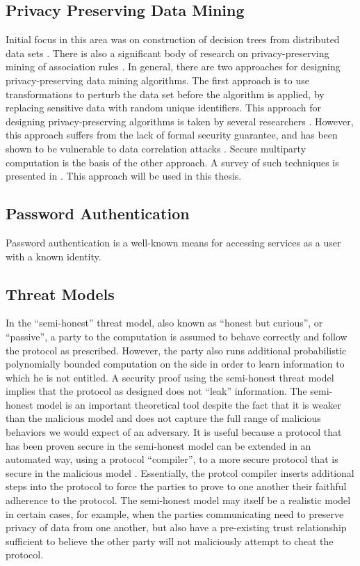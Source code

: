 \subsection{Privacy Preserving Data Mining }

Initial focus in this area was on construction of decision trees from
distributed data sets \cite{Agrawal-Srikant,Lindell-Pinkas}. There
is also a significant body of research on privacy-preserving mining
of association rules \cite{Gehrke:2002,RizviHarista,VaidyaClifton:2002}.
In general, there are two approaches for designing privacy-preserving
data mining algorithms. The first approach is to use transformations
to perturb the data set before the algorithm is applied, by replacing
sensitive data with random unique identifiers. This approach for designing
privacy-preserving algorithms is taken by several researchers \cite{Klusch,MeruguGhosh,Oliveira}.
However, this approach suffers from the lack of formal security guarantee,
and has been shown to be vulnerable to data correlation attacks \cite{Malin04}.
Secure multiparty computation is the basis of the other approach.
A survey of such techniques is presented in \cite{PinkasCryptoPPDM02}.
This approach will be used in this thesis.

\subsection{Password Authentication}
Password authentication is a well-known means for accessing services as a user with a known
identity.

\subsection{Threat Models\label{sub:Threat-Models}}

In the {}``semi-honest'' threat model, also known as {}``honest
but curious'', or {}``passive'', \cite{GMW87} a party to the computation is
assumed to behave correctly and follow the protocol as prescribed.
However, the party also runs additional probabilistic polynomially
bounded computation on the side in order to learn information to which
he is not entitled. A security proof using the semi-honest threat
model implies that the protocol as designed does not {}``leak''
information. The semi-honest model is an important theoretical tool
despite the fact that it is weaker than the malicious model 
and does not capture the full range
of malicious behaviors we would expect of an adversary. It is useful because
a protocol that has been proven secure in the semi-honest model can
be extended in an automated way, using a protocol {}``compiler'',
to a more secure protocol that is secure in the malicious model \cite{GMW87}.
Essentially, the protcol compiler inserts additional steps into the
protocol to force the parties to prove to one another their faithful
adherence to the protocol. The semi-honest model may itself be a realistic
model in certain cases, for example, when the parties communicating
need to preserve privacy of data from one another, but also have a
pre-existing trust relationship sufficient to believe the other party
will not maliciously attempt to cheat the protocol.

